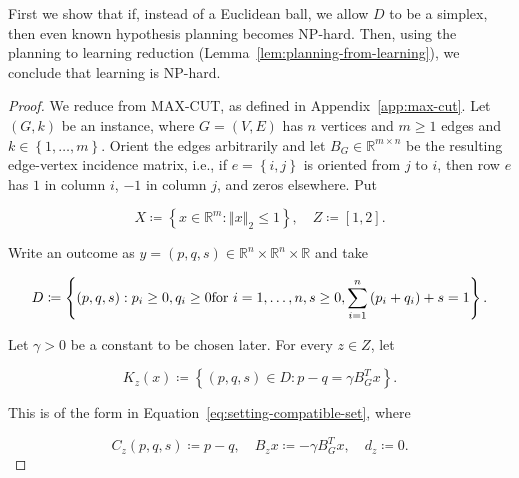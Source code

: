 {First we show that if, instead of a Euclidean ball, we allow $D$ to be a simplex, then even known hypothesis planning becomes NP-hard. Then, using the planning to learning reduction (Lemma~\ref{lem:planning-from-learning}), we conclude that learning is NP-hard.







\begin{proof}
We reduce from MAX-CUT, as defined in Appendix~\ref{app:max-cut}. Let $\left( G , k \right)$ be an
instance, where $G = \left( V , E \right)$ has $n$ vertices and $m \ge 1$ edges and
$k \in \left\{ 1 , \ldots , m \right\}$. Orient the edges arbitrarily and let
$B_{G} \in \mathbb{R}^{m \times n}$ be the resulting edge-vertex incidence matrix, i.e., if
$e = \left\{ i , j \right\}$ is oriented from $j$ to $i$, then row $e$ has $1$ in column $i$,
$- 1$ in column $j$, and zeros elsewhere. Put


\begin{equation*}
X \coloneqq \left\{ x \in \mathbb{R}^{m} : {\left\Vert x \right\Vert}_{2} \le 1 \right\} , \quad Z \coloneqq \left[ 1 , 2 \right] .
\end{equation*}


Write an outcome as $y = \left( p , q , s \right) \in \mathbb{R}^{n} \times \mathbb{R}^{n} \times \mathbb{R}$ and take


\begin{equation*}
D \coloneqq \left\{ \left( p , q , s \right) : p_{i} \ge 0 , q_{i} \ge 0 \text{\normalfont  for } i = 1 , \ldots , n , s \ge 0 , \sum_{i = 1}^{n} \left( p_{i} + q_{i} \right) + s = 1 \right\} .
\end{equation*}


Let $\gamma > 0$ be a constant to be chosen later. For every $z \in Z$, let



\begin{equation*}
K_{z} \left( x \right) \coloneqq \left\{ \left( p , q , s \right) \in D : p - q = \gamma B_{G}^{T} x \right\} .
\end{equation*}


This is of the form in Equation~\ref{eq:setting-compatible-set}, where


\begin{equation*}
C_{z} \left( p , q , s \right) \coloneqq p - q , \quad B_{z} x \coloneqq - \gamma B_{G}^{T} x , \quad d_{z} \coloneqq 0 .
\end{equation*}



\end{proof}}
